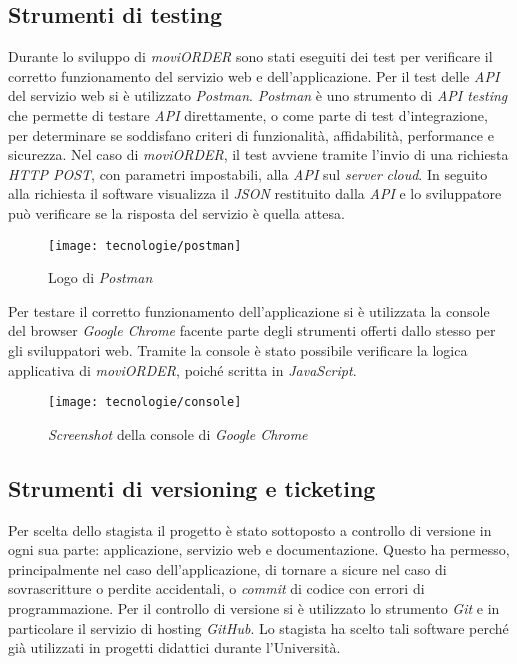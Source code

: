 \subsection{Strumenti di testing}

Durante lo sviluppo di \textit{moviORDER} sono stati eseguiti dei test per verificare il corretto funzionamento del servizio web e dell'applicazione. Per il test delle \textit{API} del servizio web si è utilizzato \textit{Postman}. \textit{Postman} è uno strumento di \textit{API testing} che permette di testare \textit{API} direttamente, o come parte di test d'integrazione, per determinare se soddisfano criteri di funzionalità, affidabilità, performance e sicurezza. Nel caso di \textit{moviORDER}, il test avviene tramite l'invio di una richiesta \textit{HTTP POST}, con parametri impostabili, alla \textit{API} sul \textit{server} \textit{cloud}. In seguito alla richiesta il software visualizza il \textit{JSON} restituito dalla \textit{API} e lo sviluppatore può verificare se la risposta del servizio è quella attesa.

\begin{figure}[!h] 
    \centering 
    \texttt{[image: tecnologie/postman]} 
    \caption{Logo di \textit{Postman}}
\end{figure}

Per testare il corretto funzionamento dell'applicazione si è utilizzata la console del browser \textit{Google Chrome} facente parte degli strumenti offerti dallo stesso per gli sviluppatori web. Tramite la console è stato possibile verificare la logica applicativa di \textit{moviORDER}, poiché scritta in \textit{JavaScript}.

\begin{figure}[!h] 
    \centering 
    \texttt{[image: tecnologie/console]} 
    \caption{\textit{Screenshot} della console di \textit{Google Chrome}}
\end{figure}

\newpage

\subsection{Strumenti di versioning e ticketing}

Per scelta dello stagista il progetto è stato sottoposto a controllo di versione in ogni sua parte: applicazione, servizio web e documentazione. Questo ha permesso, principalmente nel caso dell'applicazione, di tornare a  sicure nel caso di sovrascritture o perdite accidentali, o \textit{commit} di codice con errori di programmazione. Per il controllo di versione si è utilizzato lo strumento \textit{Git} e in particolare il servizio di hosting \textit{GitHub}. Lo stagista ha scelto tali software perché già utilizzati in progetti didattici durante l'Università.


